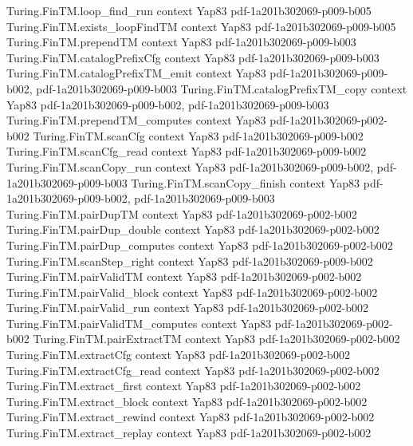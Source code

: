 \begin{theorem}
\proofstep
  {Turing.FinTM.loop_find_run}
  {context}
  {Yap83}
  {pdf-1a201b302069-p009-b005}
\proofstep
  {Turing.FinTM.exists_loopFindTM}
  {context}
  {Yap83}
  {pdf-1a201b302069-p009-b005}
\proofstep
  {Turing.FinTM.prependTM}
  {context}
  {Yap83}
  {pdf-1a201b302069-p009-b003}
\proofstep
  {Turing.FinTM.catalogPrefixCfg}
  {context}
  {Yap83}
  {pdf-1a201b302069-p009-b003}
\proofstep
  {Turing.FinTM.catalogPrefixTM_emit}
  {context}
  {Yap83}
  {pdf-1a201b302069-p009-b002,
    pdf-1a201b302069-p009-b003}
\proofstep
  {Turing.FinTM.catalogPrefixTM_copy}
  {context}
  {Yap83}
  {pdf-1a201b302069-p009-b002,
    pdf-1a201b302069-p009-b003}
\proofstep
  {Turing.FinTM.prependTM_computes}
  {context}
  {Yap83}
  {pdf-1a201b302069-p002-b002}
\proofstep
  {Turing.FinTM.scanCfg}
  {context}
  {Yap83}
  {pdf-1a201b302069-p009-b002}
\proofstep
  {Turing.FinTM.scanCfg_read}
  {context}
  {Yap83}
  {pdf-1a201b302069-p009-b002}
\proofstep
  {Turing.FinTM.scanCopy_run}
  {context}
  {Yap83}
  {pdf-1a201b302069-p009-b002,
    pdf-1a201b302069-p009-b003}
\proofstep
  {Turing.FinTM.scanCopy_finish}
  {context}
  {Yap83}
  {pdf-1a201b302069-p009-b002,
    pdf-1a201b302069-p009-b003}
\proofstep
  {Turing.FinTM.pairDupTM}
  {context}
  {Yap83}
  {pdf-1a201b302069-p002-b002}
\proofstep
  {Turing.FinTM.pairDup_double}
  {context}
  {Yap83}
  {pdf-1a201b302069-p002-b002}
\proofstep
  {Turing.FinTM.pairDup_computes}
  {context}
  {Yap83}
  {pdf-1a201b302069-p002-b002}
\proofstep
  {Turing.FinTM.scanStep_right}
  {context}
  {Yap83}
  {pdf-1a201b302069-p009-b002}
\proofstep
  {Turing.FinTM.pairValidTM}
  {context}
  {Yap83}
  {pdf-1a201b302069-p002-b002}
\proofstep
  {Turing.FinTM.pairValid_block}
  {context}
  {Yap83}
  {pdf-1a201b302069-p002-b002}
\proofstep
  {Turing.FinTM.pairValid_run}
  {context}
  {Yap83}
  {pdf-1a201b302069-p002-b002}
\proofstep
  {Turing.FinTM.pairValidTM_computes}
  {context}
  {Yap83}
  {pdf-1a201b302069-p002-b002}
\proofstep
  {Turing.FinTM.pairExtractTM}
  {context}
  {Yap83}
  {pdf-1a201b302069-p002-b002}
\proofstep
  {Turing.FinTM.extractCfg}
  {context}
  {Yap83}
  {pdf-1a201b302069-p002-b002}
\proofstep
  {Turing.FinTM.extractCfg_read}
  {context}
  {Yap83}
  {pdf-1a201b302069-p002-b002}
\proofstep
  {Turing.FinTM.extract_first}
  {context}
  {Yap83}
  {pdf-1a201b302069-p002-b002}
\proofstep
  {Turing.FinTM.extract_block}
  {context}
  {Yap83}
  {pdf-1a201b302069-p002-b002}
\proofstep
  {Turing.FinTM.extract_rewind}
  {context}
  {Yap83}
  {pdf-1a201b302069-p002-b002}
\proofstep
  {Turing.FinTM.extract_replay}
  {context}
  {Yap83}
  {pdf-1a201b302069-p002-b002}

\end{theorem}
